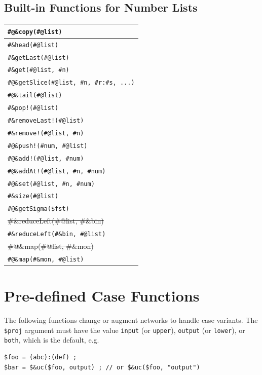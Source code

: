 \documentclass[letterpaper,12pt]{article}
\begin{document}
\subsection{Built-in Functions for Number Lists}

\begin{tabular}{|l|}
\hline
\verb!#@&copy(#@list)! \\
\hline
\verb!#&head(#@list)! \\
\verb!#&getLast(#@list)! \\
\verb!#&get(#@list, #n)! \\
\verb!#@&getSlice(#@list, #n, #r:#s, ...)! \\
\verb!#@&tail(#@list)! \\
\hline
\verb+#&pop!(#@list)+ \\
\verb+#&removeLast!(#@list)+ \\
\verb+#&remove!(#@list, #n)+ \\
\hline
\verb+#@&push!(#num, #@list)+ \\
\verb+#@&add!(#@list, #num)+ \\
\verb+#@&addAt!(#@list, #n, #num)+ \\
\hline
\verb!#@&set(#@list, #n, #num)! \\
\hline
\verb!#&size(#@list)! \\
\verb!#@&getSigma($fst)! \\
\hline
\sout{\#\&reduceLeft(\#@list, \#\&bin)} \\
\verb!#&reduceLeft(#&bin, #@list)! \\
\hline
\sout{\#@\&map(\#@list, \#\&mon)} \\
\verb!#@&map(#&mon, #@list)! \\
\hline

\end{tabular}

\newpage

\section{Pre-defined Case Functions}


The following functions change or augment networks to handle case
variants.  The \verb!$proj! argument must have the value \texttt{input}
(or \texttt{upper}), \texttt{output} (or \texttt{lower}), or
\texttt{both}, which is the default, e.g.

\begin{Verbatim}[fontsize=\small]
$foo = (abc):(def) ;
$bar = $&uc($foo, output) ; // or $&uc($foo, "output")
\end{Verbatim}
\end{document}

